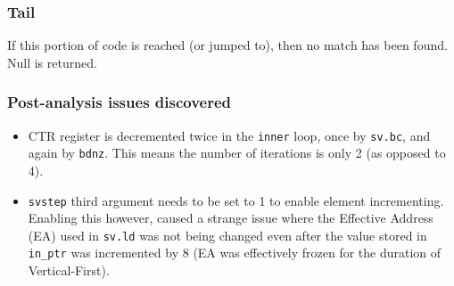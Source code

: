\subsubsection{Tail}

If this portion of code is reached (or jumped to), then no
match has been found. Null is returned.

\subsubsection{Post-analysis issues discovered}

\begin{itemize}
  \item CTR register is decremented twice in the \texttt{inner} loop, once by
  \texttt{sv.bc}, and again by \texttt{bdnz}.
  This means the number of iterations is only 2 (as opposed to 4).
  \item \texttt{svstep} third argument needs to be set to 1 to enable
  element incrementing. Enabling this however, caused a strange issue where the
  Effective Address (EA) used in \texttt{sv.ld} was not being changed even
  after the value stored in \texttt{in\_ptr} was incremented by 8
  (EA was effectively frozen for the duration of Vertical-First).
\end{itemize}